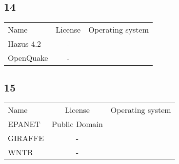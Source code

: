 \subsection{14}

\begin{table}[]
    \centering
    \begin{tabular}{l|cc}
    \toprule
    Name &  License & Operating system\\ 
        Hazus 4.2 & - &\\
        OpenQuake & - &\\ 
    \bottomrule
    \end{tabular}
\end{table}

\subsection{15}

\begin{table}[]
    \centering
    \begin{tabular}{l|cc}
    \toprule
    Name &  License & Operating system\\ 
        EPANET &  Public Domain &\\
        GIRAFFE & - &\\
        WNTR & - &\\ 
    \bottomrule
    \end{tabular}
\end{table}
